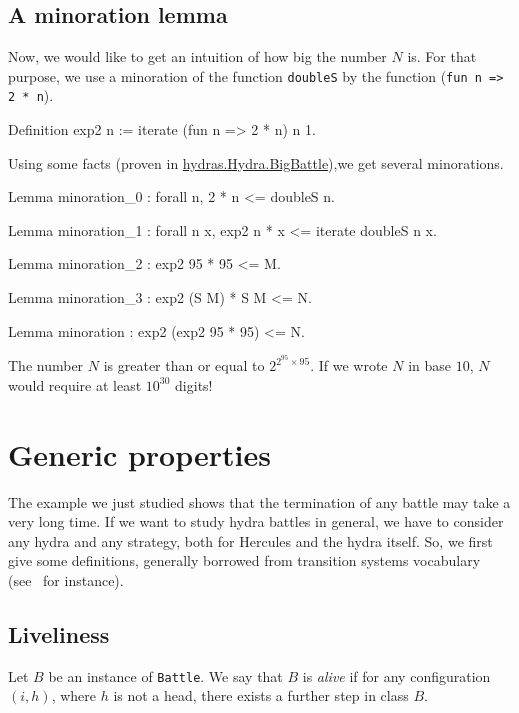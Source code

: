 \subsection{A minoration lemma}

Now, we would like to get an intuition of  how big the number $N$ is.
For that purpose, we use a minoration of the function \texttt{doubleS} by the
function (\texttt{fun n => 2 * n}).

\begin{Coqsrc}
Definition exp2 n := iterate (fun n => 2 * n) n 1.
\end{Coqsrc}
Using some facts (proven in 
\href{../theories/html/hydras.Hydra.BigBattle.html}{hydras.Hydra.BigBattle}),we get several  minorations.

\begin{Coqsrc}
Lemma minoration_0 : forall n,  2 * n <= doubleS n.

Lemma minoration_1 : forall n x, exp2 n * x <= iterate doubleS n x.

Lemma minoration_2 : exp2 95 * 95 <= M.

Lemma minoration_3 : exp2 (S M) * S M <= N.

Lemma minoration : exp2 (exp2 95 * 95) <= N.
\end{Coqsrc}


The number $N$ is greater than or  equal to $2^{2^{95}\times 95}.$ If we wrote $N$ in base $10$, $N$ would require at least $10^{30}$ digits!


\section{Generic properties}


The example we just studied shows that the termination of any battle may take a very long time. If we want to study hydra battles in general, we have to consider 
any hydra and any strategy, both for Hercules and the hydra itself. So, we first  give some definitions, generally borrowed from transition systems vocabulary (see~\cite{tel_2000} for instance).


\subsection{Liveliness}


Let $B$ be an instance of \texttt{Battle}. We say that $B$ is \emph{alive} if
for any configuration $(i,h)$, where $h$ is not a head, there exists a further step in class $B$.


